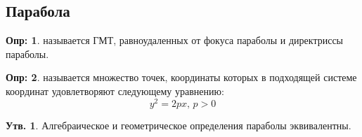 \documentclass[12pt]{article}
\theoremstyle{definition}
\newtheorem{defn}{Опр:}
\newtheorem{prop}{Утв.}
\begin{document}
\newpage
\subsection*{Парабола}

\begin{defn}
	 называется ГМТ, равноудаленных от фокуса параболы и директриссы параболы. 
\end{defn}

\begin{defn}
	 называется множество точек, координаты которых в подходящей системе координат удовлетворяют следующему уравнению:
	$$
		y^2 = 2px, \, p > 0
	$$
\end{defn}

\begin{prop}
	Алгебраическое и геометрическое определения параболы эквивалентны.
\end{prop}
\end{document}
